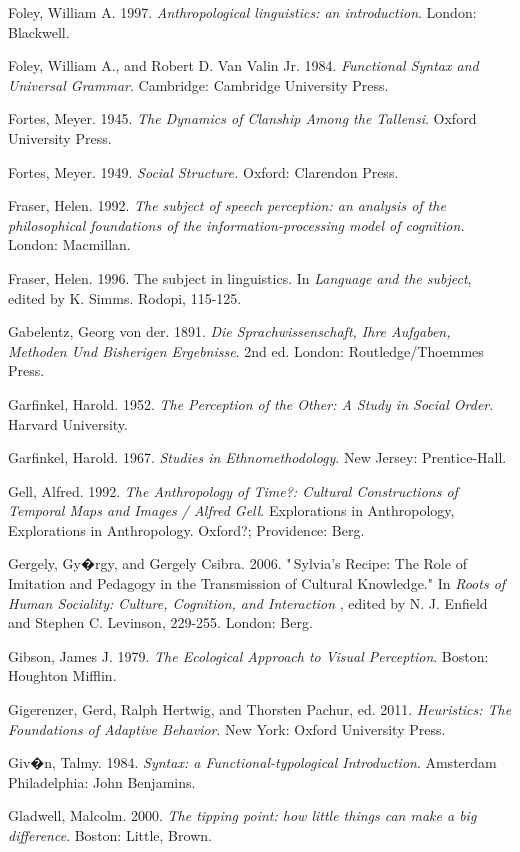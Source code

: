 Foley, William A. 1997. \textit{Anthropological linguistics: an 
introduction}. London: Blackwell.

Foley, William A., and Robert D. Van Valin Jr. 1984. \textit{Functional 
Syntax and Universal Grammar}. Cambridge: Cambridge University Press.

Fortes, Meyer. 1945. \textit{The Dynamics of Clanship Among the 
Tallensi}. Oxford University Press.

Fortes, Meyer. 1949. \textit{Social Structure.} Oxford: Clarendon 
Press.

Fraser, Helen. 1992. \textit{The subject of speech perception: an 
analysis of the philosophical foundations of the information-processing 
model of cognition.} London: Macmillan.

Fraser, Helen. 1996. The subject in linguistics. In \textit{Language 
and the subject}, edited by K. Simms. Rodopi, 115-125.

Gabelentz, Georg von der. 1891. \textit{Die Sprachwissenschaft, Ihre 
Aufgaben, Methoden Und Bisherigen Ergebnisse}. 2nd ed. London: 
Routledge/Thoemmes Press.

Garfinkel, Harold. 1952. \textit{The Perception of the Other: A Study 
in Social Order}. Harvard University.

Garfinkel, Harold. 1967. \textit{Studies in Ethnomethodology}. New 
Jersey: Prentice-Hall.

Gell, Alfred. 1992. \textit{The Anthropology of Time?: Cultural 
Constructions of Temporal Maps and Images / Alfred Gell}. Explorations 
in Anthropology, Explorations in Anthropology. Oxford?; Providence: 
Berg.

Gergely, Gy�rgy, and Gergely Csibra. 2006. "\,Sylvia's Recipe: The Role 
of Imitation and Pedagogy in the Transmission of Cultural Knowledge." In 
\textit{Roots of Human Sociality: Culture, Cognition, and Interaction}
, edited by N. J. Enfield and Stephen C. Levinson, 229-255. London: 
Berg.

Gibson, James J. 1979. \textit{The Ecological Approach to Visual 
Perception}. Boston: Houghton Mifflin.

Gigerenzer, Gerd, Ralph Hertwig, and Thorsten Pachur, ed. 2011. \textit{
Heuristics: The Foundations of Adaptive Behavior}. New York: Oxford 
University Press.

Giv�n, Talmy. 1984. \textit{Syntax: a Functional-typological 
Introduction}. Amsterdam Philadelphia: John Benjamins.

Gladwell, Malcolm. 2000. \textit{The tipping point: how little things 
can make a big difference}. Boston: Little, Brown.

